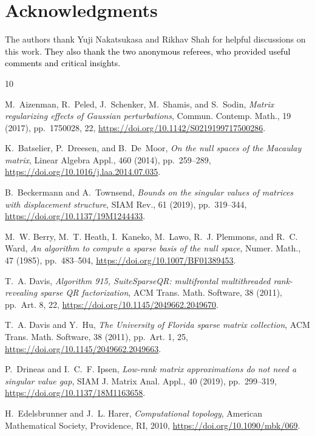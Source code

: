 \documentclass{siamart190516}
\newcommand{\edit}[1]{\textcolor{black}{#1}} %
\begin{document}
\section*{Acknowledgments}
The authors thank Yuji Nakatsukasa and Rikhav Shah for helpful discussions on this work. \edit{They also thank the two anonymous
referees, who provided useful comments and critical insights.}
\begin{thebibliography}{10}

{\sc M.~Aizenman, R.~Peled, J.~Schenker, M.~Shamis, and S.~Sodin}, {\em Matrix
  regularizing effects of {G}aussian perturbations}, Commun. Contemp. Math., 19
  (2017), pp.~1750028, 22, \url{https://doi.org/10.1142/S0219199717500286}.

{\sc K.~Batselier, P.~Dreesen, and B.~De~Moor}, {\em On the null spaces of the
  {M}acaulay matrix}, Linear Algebra Appl., 460 (2014), pp.~259--289,
  \url{https://doi.org/10.1016/j.laa.2014.07.035}.

{\sc B.~Beckermann and A.~Townsend}, {\em Bounds on the singular values of
  matrices with displacement structure}, SIAM Rev., 61 (2019), pp.~319--344,
  \url{https://doi.org/10.1137/19M1244433}.

{\sc M.~W. Berry, M.~T. Heath, I.~Kaneko, M.~Lawo, R.~J. Plemmons, and R.~C.
  Ward}, {\em An algorithm to compute a sparse basis of the null space}, Numer.
  Math., 47 (1985), pp.~483--504, \url{https://doi.org/10.1007/BF01389453}.

{\sc T.~A. Davis}, {\em Algorithm 915, {S}uite{S}parse{QR}: multifrontal
  multithreaded rank-revealing sparse {QR} factorization}, ACM Trans. Math.
  Software, 38 (2011), pp.~Art. 8, 22,
  \url{https://doi.org/10.1145/2049662.2049670}.

{\sc T.~A. Davis and Y.~Hu}, {\em The {U}niversity of {F}lorida sparse matrix
  collection}, ACM Trans. Math. Software, 38 (2011), pp.~Art. 1, 25,
  \url{https://doi.org/10.1145/2049662.2049663}.

{\sc P.~Drineas and I.~C.~F. Ipsen}, {\em Low-rank matrix approximations do not
  need a singular value gap}, SIAM J. Matrix Anal. Appl., 40 (2019),
  pp.~299--319, \url{https://doi.org/10.1137/18M1163658}.

{\sc H.~Edelsbrunner and J.~L. Harer}, {\em Computational topology}, American
  Mathematical Society, Providence, RI, 2010,
  \url{https://doi.org/10.1090/mbk/069}.


\end{thebibliography}
\end{document}
